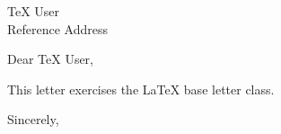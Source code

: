 \documentclass{letter}
\begin{document}
\begin{letter}{TeX User\\Reference Address}
\opening{Dear TeX User,}
This letter exercises the LaTeX base letter class.
\closing{Sincerely,}
\end{letter}
\end{document}
